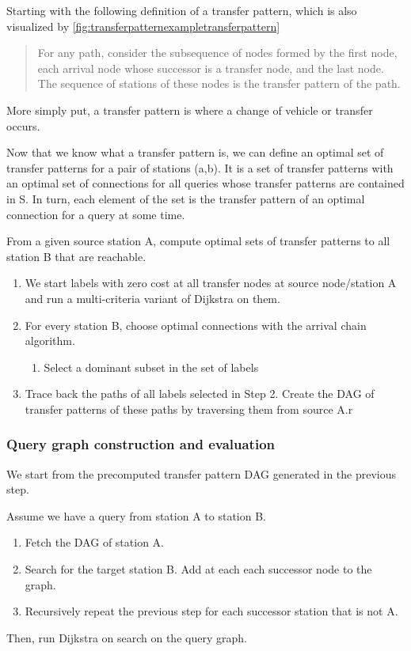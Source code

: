  Starting with the following definition\cite{bast_fast_2010} of a transfer pattern, which is also visualized by \autoref{fig:transferpatternexampletransferpattern}
\begin{quote}
    For any path, consider the subsequence of nodes formed by the first node, each arrival node whose successor is a transfer node, and the last node. The sequence of stations of these nodes is the transfer pattern of the path.
\end{quote}

More simply put, a transfer pattern is where a change of vehicle or transfer occurs. 

Now that we know what a transfer pattern is, we can define an optimal set of transfer patterns for a pair of stations (a,b). It is a set of transfer patterns with an optimal set of connections for all queries whose transfer patterns are contained in S. In turn, each element of the set is the transfer pattern of an optimal connection for a query at some time. 

From a given source station A, compute optimal sets of transfer patterns to all station B that are reachable. 
\begin{enumerate}
    \item We start labels with zero cost at all transfer nodes at source node/station A and run a multi-criteria variant of Dijkstra on them.
    \item For every station B, choose optimal connections with the arrival chain algorithm.
    \begin{enumerate}
        \item Select a dominant subset in the set of labels
    \end{enumerate}
    \item Trace back the paths of all labels selected in Step 2. Create the DAG of transfer patterns of these paths by traversing them from source A.r
\end{enumerate}
\subsubsection{Query graph construction and evaluation}
We start from the precomputed transfer pattern DAG generated in the previous step.

Assume we have a query from station A to station B.
\begin{enumerate}
    \item Fetch the DAG of station A.
    \item Search for the target station B. Add at each each successor node to the graph.
    \item Recursively repeat the previous step for each successor station that is not A.
\end{enumerate}
Then, run Dijkstra on search on the query graph.

